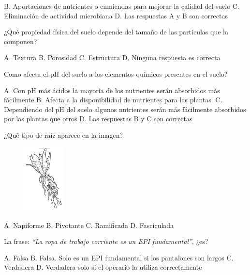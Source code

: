 \documentclass[11pt]{exam}
\begin{document}
{\begin{questions}
\begin{checkboxes}
    \choice B. Aportaciones de nutrientes o enmiendas para mejorar la calidad del suelo
    \choice C. Eliminación de actividad microbiana
    \CorrectChoice D. Las respuestas A y B son correctas
  \end{checkboxes}
\question ¿Qué propiedad física del suelo depende del tamaño de las partículas que la
  componen?
  \begin{checkboxes}
    \CorrectChoice A. Textura
    \choice B. Porosidad
    \choice C. Estructura
    \choice D. Ninguna respuesta es correcta
  \end{checkboxes}
\question Como afecta el pH del suelo a los elementos químicos presentes en el suelo?
  \begin{checkboxes}
    \choice A. Con pH más ácidos la mayoría de los nutrientes serán absorbidos más
    fácilmente
    \choice B. Afecta a la disponibilidad de nutrientes para las plantas.
    \choice C. Dependiendo del pH del suelo algunos nutrientes serán más fácilmente
    absorbidos por las plantas que otros
    \CorrectChoice D. Las respuestas B y C son correctas
  \end{checkboxes}
\question ¿Qué tipo de raíz aparece en la imagen?
  \begin{figure}[h!]
    \centering
    \includegraphics[width=0.2\textwidth]{fasciculada.PNG}
  \end{figure}
  \begin{checkboxes}
    \choice A. Napiforme
    \choice B. Pivotante
    \choice C. Ramificada
    \CorrectChoice D. Fasciculada
  \end{checkboxes}
\question La frase: \emph{``La ropa de trabajo corriente es un EPI fundamental''}, ¿es?
  \begin{checkboxes}
    \CorrectChoice A. Falsa
    \choice B. Falsa. Solo es un EPI fundamental si los pantalones son largos
    \choice C. Verdadera
    \choice D. Verdadera solo si el operario la utiliza correctamente
  \end{checkboxes}
 

\end{questions}}
\end{document}
